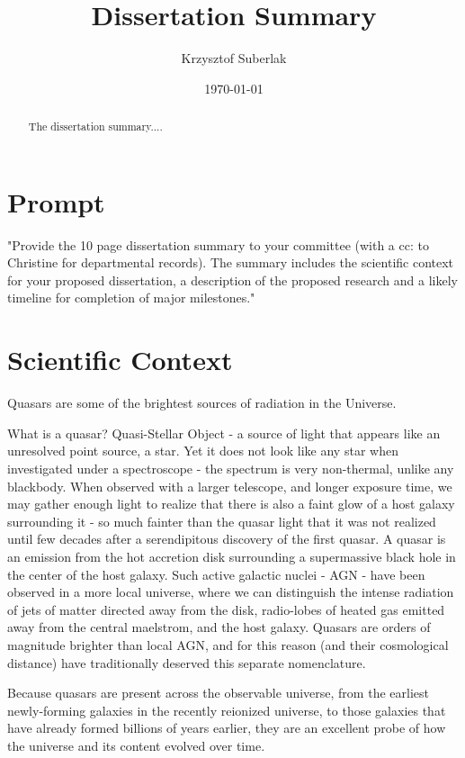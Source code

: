\documentclass[modern]{aastex62}
\begin{document}
\title{Dissertation Summary}
\author{Krzysztof Suberlak}

\date{ \today
}

\begin{abstract}
The dissertation summary.... 
\end{abstract}

\section*{Prompt}
"Provide the 10 page dissertation summary to your committee (with a cc: to Christine for
departmental records). The summary includes the scientific context for your proposed
dissertation, a description of the proposed research and a likely timeline for completion of
major milestones."

\section{Scientific Context}

Quasars are some of the brightest sources of radiation in the Universe. 

What is a quasar? Quasi-Stellar Object - a source of light that appears like an unresolved point source, a star. Yet it does not look like any star when investigated under a spectroscope - the spectrum is very non-thermal,  unlike any blackbody. When observed with a larger telescope, and longer exposure time, we may gather enough light to realize that there is also a faint glow of a host galaxy  surrounding it - so much fainter than the quasar light that it was not realized until few decades after a serendipitous discovery of the first quasar. A quasar is an emission from the hot accretion disk surrounding a supermassive black hole in the center of the host galaxy.  Such active galactic nuclei - AGN - have been observed in a more local universe, where we can distinguish the intense radiation of  jets of matter directed away from the disk, radio-lobes of heated gas emitted away from the central maelstrom, and the host galaxy. Quasars are orders of magnitude brighter than local AGN, and for this reason (and their cosmological distance) have traditionally deserved this separate nomenclature. 

Because quasars are present across the observable universe, from the earliest newly-forming galaxies in the recently reionized universe, to those galaxies that have already formed billions of years earlier, they are an excellent probe of how the universe and its content evolved over time. 
\end{document}
